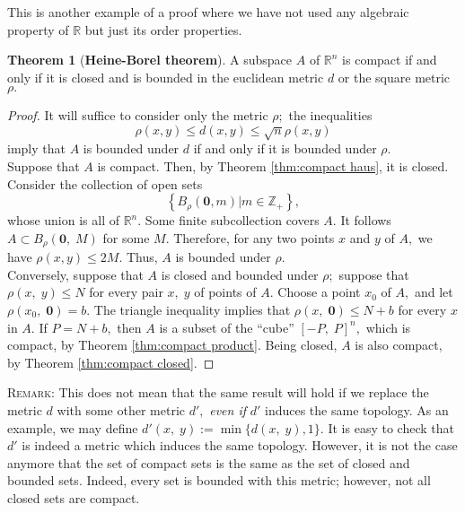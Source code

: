 \documentclass{article}
\theoremstyle{definition}
\newtheorem{theorem}{Theorem}[section]
\begin{document}
This is another example of a proof where we have not used any algebraic property of $\mathbb{R}$ but just its order properties.
\begin{theorem}[\textbf{Heine-Borel theorem}] \label{thm:heine-borel}
  A subspace $A$ of $\mathbb{R}^n$ is compact if and only if it is closed and is bounded in the euclidean metric $d$ or the square metric $\rho.$
\end{theorem}
\begin{proof}
  It will suffice to consider only the metric $\rho;$ the inequalities
  \[\rho(x, y) \leq d(x, y) \leq \sqrt{n} \rho(x, y)\]
  imply that $A$ is bounded under $d$ if and only if it is bounded under $\rho.$\\
  Suppose that $A$ is compact. Then, by Theorem \ref{thm:compact haus}, it is closed. Consider the collection of open sets
  \[\left\{B_{\rho}(\mathbf{0}, m) | m \in \mathbb{Z}_{+}\right\},\]
  whose union is all of $\mathbb{R}^n.$ Some finite subcollection covers $A.$ It follows $A \subset B_\rho(\mathbf{0},\;M)$ for some $M.$ Therefore, for any two points $x$ and $y$ of $A,$ we have $\rho(x, y) \le 2M.$ Thus, $A$ is bounded under $\rho.$\\
  Conversely, suppose that $A$ is closed and bounded under $\rho;$ suppose that $\rho(x,\;y) \le N$ for every pair $x,\;y$ of points of $A.$ Choose a point $x_0$ of $A,$ and let $\rho(x_0,\;\mathbf{0}) = b.$ The triangle inequality implies that $\rho(x,\;\mathbf{0}) \le N + b$ for every $x$ in $A.$ If $P = N+ b,$ then $A$ is a subset of the ``cube'' $[-P,\;P]^n,$ which is compact, by Theorem \ref{thm:compact product}. Being closed, $A$ is also compact, by Theorem \ref{thm:compact closed}.
\end{proof}
\textsc{Remark:} This does not mean that the same result will hold if we replace the metric $d$ with some other metric $d',$ \emph{even if} $d'$ induces the same topology. As an example, we may define $d'(x,\;y) := \min\{d(x,\;y), 1\}.$ It is easy to check that $d'$ is indeed a metric which induces the same topology. However, it is not the case anymore that the set of compact sets is the same as the set of closed and bounded sets. Indeed, every set is bounded with this metric; however, not all closed sets are compact.
\newpage
\end{document}

